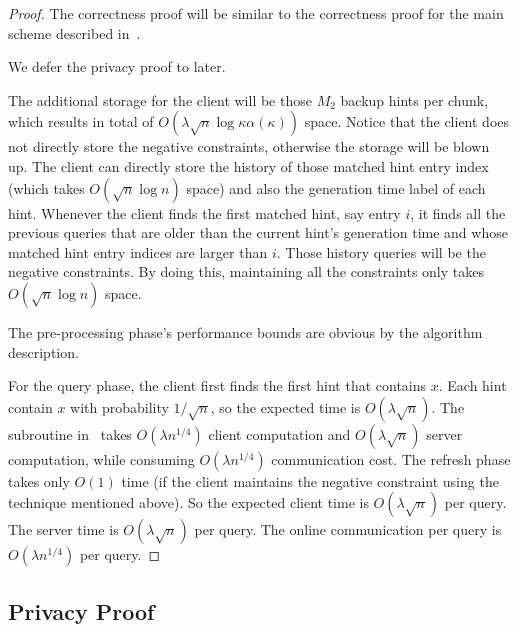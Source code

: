 \begin{proof}
    The correctness proof will be similar to the correctness proof for the main scheme described in~.
    
    We defer the privacy proof to later.
    
    The additional storage for the client will be those $M_2$ backup hints per
    chunk, which results in total of $O(\lambda\sqrt{n}\log \kappa
    \alpha(\kappa))$ space. Notice that the client does not directly store the
    negative constraints, otherwise the storage will be blown up. The client can
    directly store the history of those matched hint entry index (which takes
    $O(\sqrt{n}\log n)$ space) and also the generation time label of each hint.
    Whenever the client finds the first matched hint, say entry $i$, it finds
    all the previous queries that are older than the current hint's generation
    time and whose matched hint entry indices are larger than $i$. Those history
    queries will be the negative constraints. By doing this, maintaining all the
    constraints only takes $O(\sqrt{n}\log n)$ space.
    
    
    The pre-processing phase's performance bounds are obvious by the algorithm description.
    
    For the query phase, the client first finds the first hint that contains
    $x$. Each hint contain $x$ with probability $1/\sqrt{n}$, so the expected
    time is $O(\lambda\sqrt{n})$. The subroutine in~ takes $O(\lambda
    n^{1/4})$ client computation and $O(\lambda \sqrt{n})$ server computation,
    while consuming $O(\lambda n^{1/4})$ communication cost. The refresh phase
    takes only $O(1)$ time (if the client maintains the negative constraint
    using the technique mentioned above). So the expected client time is
    $O(\lambda\sqrt{n})$ per query. The server time is
    $O(\lambda\sqrt{n})$ per query. The online communication per query is
    $O(\lambda n^{1/4})$ per query.
\end{proof}


\subsection{Privacy Proof}


